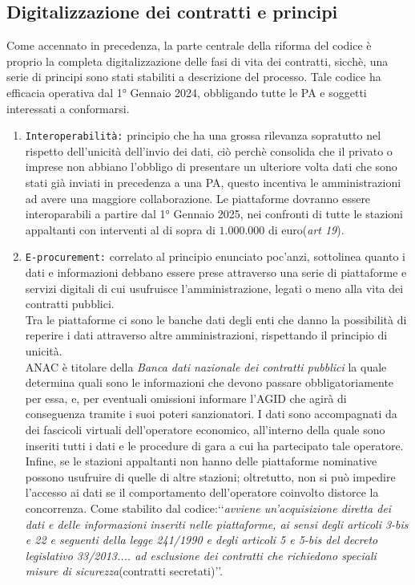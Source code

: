 \documentclass{article}
\begin{document}
\newpage\subsection{Digitalizzazione dei contratti e principi}
\begin{justify}
    Come accennato in precedenza, la parte centrale della riforma del codice è proprio la completa digitalizzazione delle fasi di vita dei contratti, sicchè, una serie di principi sono stati stabiliti a descrizione del processo.
    Tale codice ha efficacia operativa dal 1° Gennaio 2024, obbligando tutte le PA e soggetti interessati a conformarsi.\\
    \begin{enumerate}
        \item \texttt{Interoperabilità:} principio che ha una grossa rilevanza sopratutto nel rispetto dell'unicità dell'invio dei dati, ciò perchè consolida che il privato o imprese non abbiano l'obbligo di presentare un ulteriore volta dati che sono stati già inviati in precedenza a una PA, questo incentiva le amministrazioni ad avere una maggiore collaborazione. Le piattaforme dovranno essere interoparabili a partire dal 1° Gennaio 2025, nei confronti di tutte le stazioni appaltanti con interventi al di sopra di $1.000.000$ di euro(\textit{art 19}).
        \item \texttt{E-procurement:} correlato al principio enunciato poc'anzi, sottolinea quanto i dati e informazioni debbano essere prese attraverso una serie di piattaforme e servizi digitali di cui usufruisce l'amministrazione, legati o meno alla vita dei contratti pubblici.\\ Tra le piattaforme ci sono le banche dati degli enti che danno la possibilità di reperire i dati attraverso altre amministrazioni, rispettando il principio di unicità.\\
        ANAC è titolare della \textit{Banca dati nazionale dei contratti pubblici} la quale determina quali sono le informazioni che devono passare obbligatoriamente per essa, e, per eventuali omissioni informare l'AGID che agirà di conseguenza tramite i suoi poteri sanzionatori. I dati sono accompagnati da dei fascicoli virtuali dell'operatore economico, all'interno della quale sono inseriti tutti i dati e le procedure di gara a cui ha partecipato tale operatore. Infine, se le stazioni appaltanti non hanno delle piattaforme nominative possono usufruire di quelle di altre stazioni; oltretutto, non si può impedire l'accesso ai dati se il comportamento dell'operatore coinvolto distorce la concorrenza. Come stabilito dal codice:‘‘\textit{avviene un'acquisizione diretta dei dati e delle informazioni inseriti nelle piattaforme, ai sensi degli articoli 3-bis e 22 e seguenti della legge 241/1990 e degli articoli 5 e 5-bis del decreto legislativo 33/2013.... ad esclusione dei contratti che richiedono speciali misure di sicurezza}(contratti secretati)’’.\\

\end{enumerate}
\end{justify}
\end{document}
